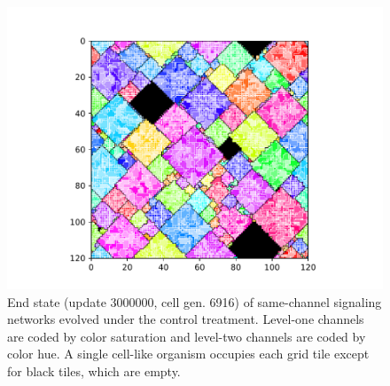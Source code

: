 \begin{figure}%
\begin{center}

\includegraphics[width=\columnwidth,trim={2.5cm 0.5cm 2.5cm 1cm},clip]{img/ChannelMap_1018_update3000000}

\caption{
End state (update 3000000, cell gen. 6916) of same-channel signaling networks evolved under the control treatment.
Level-one channels are coded by color saturation and level-two channels are coded by color hue.
A single cell-like organism occupies each grid tile except for black tiles, which are empty.
}
\label{fig:outcome_control}
\end{center}
\end{figure}
